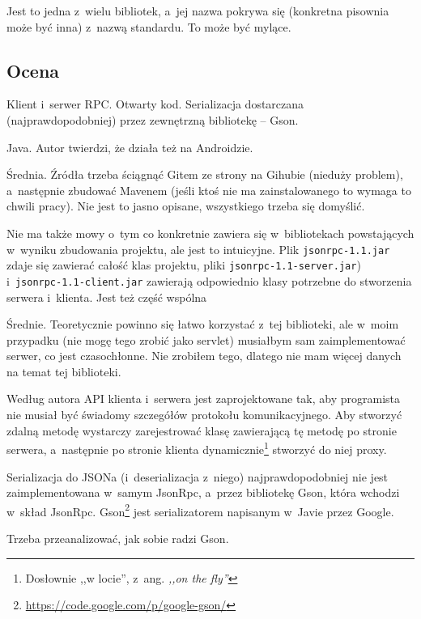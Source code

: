 Jest to jedna z~wielu bibliotek, a~jej nazwa pokrywa się (konkretna pisownia może być inna) z~nazwą standardu. To może być mylące. 

\subsection{Ocena}

\begin{description}
Klient i~serwer RPC. Otwarty kod. Serializacja dostarczana (najprawdopodobniej) przez zewnętrzną bibliotekę -- Gson.

Java. Autor twierdzi, że działa też na Androidzie.

Średnia.
Źródła trzeba ściągnąć Gitem ze strony na Gihubie (nieduży problem), a~następnie zbudować Mavenem (jeśli ktoś nie ma zainstalowanego to wymaga to chwili pracy). Nie jest to jasno opisane, wszystkiego trzeba się domyślić.

Nie ma także mowy o~tym co konkretnie zawiera się w~bibliotekach powstających w~wyniku zbudowania projektu, ale jest to intuicyjne. Plik \texttt{jsonrpc-1.1.jar} zdaje się zawierać całość klas projektu, pliki \texttt{jsonrpc-1.1-server.jar}) i~\texttt{jsonrpc-1.1-client.jar} zawierają odpowiednio klasy potrzebne do stworzenia serwera i~klienta. Jest też część wspólna 

Średnie. Teoretycznie powinno się łatwo korzystać z~tej biblioteki, ale w~moim przypadku (nie mogę tego zrobić jako servlet) musiałbym sam zaimplementować serwer, co jest czasochłonne.
Nie zrobiłem tego, dlatego nie mam więcej danych na temat tej biblioteki.

Według autora API klienta i~serwera jest zaprojektowane tak, aby programista nie musiał być świadomy szczegółów protokołu komunikacyjnego.
Aby stworzyć zdalną metodę wystarczy zarejestrować klasę zawierającą tę metodę po stronie serwera, a~następnie po stronie klienta dynamicznie\footnote{Dosłownie ,,w locie'', z~ang. \emph{,,on the fly''}} stworzyć do niej proxy.










Serializacja do JSONa (i~deserializacja z~niego) najprawdopodobniej nie jest zaimplementowana w~samym JsonRpc, a~przez bibliotekę Gson, która wchodzi w~skład JsonRpc. Gson\footnote{\url{https://code.google.com/p/google-gson/}} jest serializatorem napisanym w~Javie przez Google.

Trzeba przeanalizować, jak sobie radzi Gson.

\end{description}

